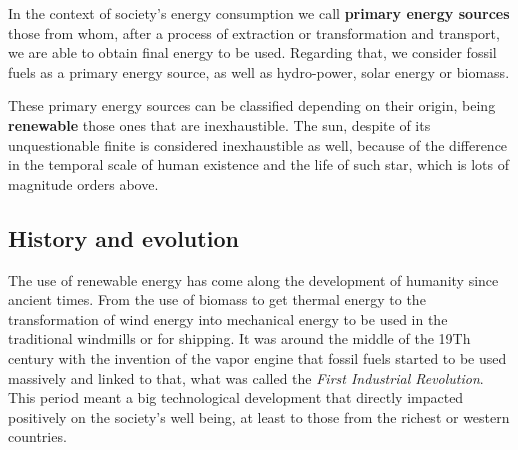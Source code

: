  


In the context of society's energy consumption we call \textbf{primary energy sources} those from whom, after a process of extraction or transformation and transport, we are able to obtain final energy to be used. Regarding that, we consider fossil fuels as a primary energy source, as well as hydro-power, solar energy or biomass. %

These primary energy sources can be classified depending on their origin, being \textbf{renewable} those ones that are inexhaustible. The sun, despite of its unquestionable finite is considered inexhaustible as well, because of the difference in the temporal scale of  human existence and the life of such star, which is lots of magnitude orders above.

\subsection{History and evolution}

The use of renewable energy has come along the development of humanity since ancient times. From the use of biomass to get thermal energy to the transformation of wind energy into mechanical energy to be used in the traditional windmills or for shipping. It was around the middle of the 19Th century with the invention of the vapor engine that fossil fuels started to be used massively and linked to that, what was called the \textit{First Industrial Revolution}. This period meant a big technological development that directly impacted positively on the society's  well being, at least to those from the richest or western countries.

